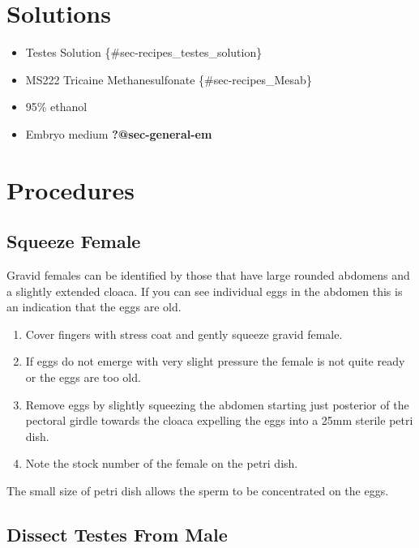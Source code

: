 \documentclass[
  letterpaper,
  DIV=11,
  numbers=noendperiod]{scrreprt}
\providecommand{\tightlist}{%
  \setlength{\itemsep}{0pt}\setlength{\parskip}{0pt}}\usepackage{longtable,booktabs,array}
\begin{document}
\hypertarget{solutions-39}{%
\section{Solutions}\label{solutions-39}}

\begin{itemize}
\tightlist
\item
  Testes Solution \{\#sec-recipes\_testes\_solution\}
\item
  MS222 Tricaine Methanesulfonate \{\#sec-recipes\_Mesab\}
\item
  95\% ethanol
\item
  Embryo medium \textbf{?@sec-general-em}
\end{itemize}

\hypertarget{procedures}{%
\section{Procedures}\label{procedures}}

\hypertarget{squeeze-female}{%
\subsection{Squeeze Female}\label{squeeze-female}}

Gravid females can be identified by those that have large rounded
abdomens and a slightly extended cloaca. If you can see individual eggs
in the abdomen this is an indication that the eggs are old.

\begin{enumerate}
\def\labelenumi{\arabic{enumi}.}
\tightlist
\item
  Cover fingers with stress coat and gently squeeze gravid female.
\item
  If eggs do not emerge with very slight pressure the female is not
  quite ready or the eggs are too old.
\item
  Remove eggs by slightly squeezing the abdomen starting just posterior
  of the pectoral girdle towards the cloaca expelling the eggs into a
  25mm sterile petri dish.
\item
  Note the stock number of the female on the petri dish.
\end{enumerate}

The small size of petri dish allows the sperm to be concentrated on the
eggs.

\hypertarget{dissect-testes-from-male}{%
\subsection{Dissect Testes From Male}\label{dissect-testes-from-male}}
\end{document}
